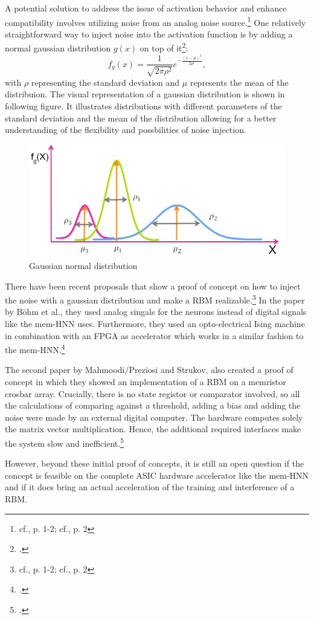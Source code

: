 A potential solution to address the issue of activation behavior and enhance compatibility involves utilizing noise from an analog noise source.\footnote{cf.\cite{bohmNoiseinjectedAnalogIsing2022}, p. 1-2; cf.\cite{mahmoodiVersatileStochasticDot2019}, p. 2}
One relatively straightforward way to inject noise into the activation function is by adding a normal gaussian distribution \(g(x)\) on top of it\footcite[cf.][3]{bohmNoiseinjectedAnalogIsing2022}:
\begin{equation}
    f_g(x) = \frac{1}{\sqrt{2\pi\rho^2}} e^{-\frac{(x-\mu)^2}{2\rho^2}},
\end{equation}
with \(\rho\) representing the standard deviation and \(\mu\) represents the mean of the distribuion.
The visual representation of a gaussian distribution is shown in following figure. 
It illustrates distributions with different parameters of the standard deviation and the mean of the distribution allowing for a better understanding of the flexibility and possbilities of noise injection. 
\begin{figure}[H]
    \centering
    \includegraphics[width=0.65\linewidth]{graphics/Gaussian_Normal_Distribution_edited.jpg}
    \caption{Gaussian normal distribution\protect\footnotemark}
    \label{normalGaussianDistribution}
\end{figure}
There have been recent proposals that show a proof of concept on how to inject the noise with a gaussian distribution and make a \ac{RBM} realizable.\footnote{cf.\cite{bohmNoiseinjectedAnalogIsing2022}, p. 1-2; cf.\cite{mahmoodiVersatileStochasticDot2019}, p. 2}
In the paper by Böhm et al., they used analog singals for the neurons instead of digital signals like the \ac{mem-HNN} uses. 
Furthermore, they used an opto-electrical Ising machine in combination with an \ac{FPGA} as accelerator which works in a similar fashion to the \ac{mem-HNN}.\footcite[cf.][1-11]{bohmNoiseinjectedAnalogIsing2022}

The second paper by Mahmoodi/Preziosi and Strukov, also created a proof of concept in which they showed an implementation of a \ac{RBM} on a memristor crosbar array.
Crucially, there is no state registor or comparator involved, so all the calculations of comparing against a threshold, adding a bias and adding the noise were made by an external digital computer. 
The hardware computes solely the matrix vector multiplication.
Hence, the additional required interfaces make the system slow and inefficient.\footcite[cf.][1-8]{mahmoodiVersatileStochasticDot2019}

However, beyond these initial proof of concepts, it is still an open question if the concept
is feasible on the complete \ac{ASIC} hardware accelerator like the \ac{mem-HNN} and if it does bring an actual acceleration of the training and interference of a \ac{RBM}.
